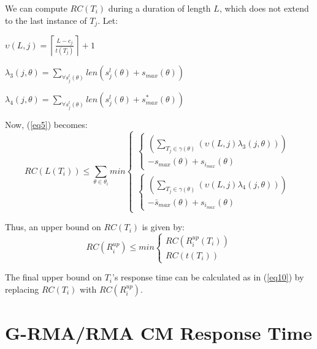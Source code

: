 \documentclass[a4paper,english]{article}
\begin{document}
We can compute $RC\left(T_{i}\right)$ during a duration of length $L$, which does not extend to the last instance of $T_{j}$. Let:
\begin{compactitem}
\item $\upsilon\left(L,j\right)=\left\lceil\frac{L-c_{j}}{t\left(T_{j}\right)}\right\rceil+1$
\item $\lambda_{3}\left(j,\theta\right)=\sum_{\forall s_{j}^{l}\left(\theta\right)}len\left(s_{j}^{l}\left(\theta\right)+s_{max}\left(\theta\right)\right)$
\item $\lambda_{4}\left(j,\theta\right)=\sum_{\forall s_{j}^{l}\left(\theta\right)}len\left(s_{j}^{l}\left(\theta\right)+s_{max}^{*}\left(\theta\right)\right)$
\end{compactitem}
Now, (\ref{eq5}) becomes: 
\begin{equation}
RC\left(L\left(T_{i}\right)\right)\le \sum_{\theta\in\theta_{i}}min\begin{cases}
\begin{cases}
\left(\sum_{T_{j}\in\gamma\left(\theta\right)}\left(\upsilon\left(L,j\right)\lambda_{3}\left(j,\theta\right)\right)\right)\\
-s_{max}\left(\theta\right)+s_{i_{max}}\left(\theta\right)\end{cases}\\
\begin{cases}
\left(\sum_{T_{j}\in\gamma\left(\theta\right)}\left(\upsilon\left(L,j\right)\lambda_{4}\left(j,\theta\right)\right)\right)\\
-\bar{s}_{max}\left(\theta\right)+s_{i_{max}}\left(\theta\right)\end{cases}\end{cases}\label{eq16}\end{equation}


Thus, an upper bound on $RC(T_i)$ is given by:
\begin{equation}
RC(R_{i}^{up})\le min\begin{cases}
RC(R_{i}^{up}(T_{i}))\\
RC(t(T_{i}))\end{cases}
\label{eq17}
\end{equation}

The final upper bound on $T_{i}$'s response time can be calculated
as in (\ref{eq10}) by replacing $RC(T_{i})$ with
$RC(R_{i}^{up})$.

\section{G-RMA/RMA CM Response Time}
\label{sec:g-rma-rma-cm}
\end{document}
